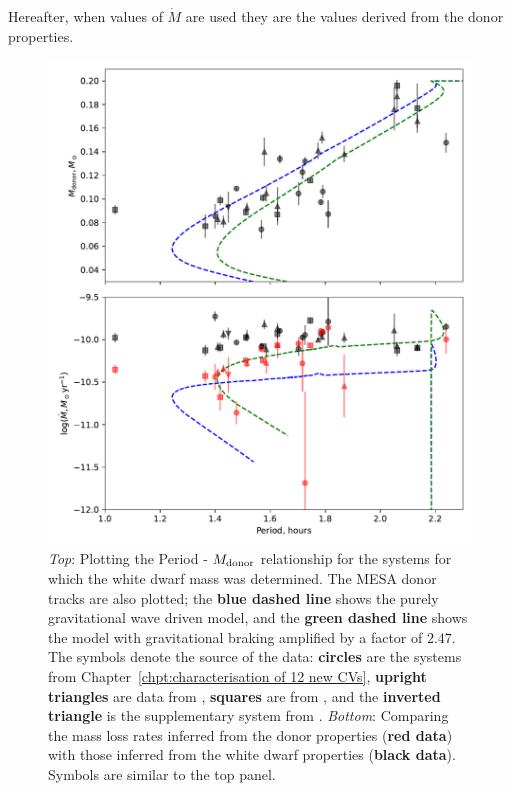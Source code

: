 Hereafter, when values of $\dot M$ are used they are the values derived from the donor properties.

\begin{figure}
    \centering
    \includegraphics[width=\textwidth]{figures/results/Mdot/compare_mdot_from_donor_vs_wd_vs_period_withmasses.pdf}
    \caption{{\it Top}: Plotting the Period - $M_{\rm donor}$ relationship for the systems for which the white dwarf mass was determined.
    The MESA donor tracks are also plotted; the {\bf blue dashed line} shows the purely gravitational wave driven model, and the {\bf green dashed line} shows the model with gravitational braking amplified by a factor of $2.47$. The symbols denote the source of the data: {\bf circles} are the systems from Chapter~\ref{chpt:characterisation of 12 new CVs}, {\bf upright triangles} are data from \citet{McAllister2019}, {\bf squares} are from \citet{Savoury2011}, and the {\bf inverted triangle} is the supplementary system from \citet{mcallister2017b}.
        {\it Bottom}: Comparing the mass loss rates inferred from the donor properties ({\bf red data}) with those inferred from the white dwarf properties ({\bf black data}). Symbols are similar to the top panel.}
    \label{fig:massloss and AML:compare Mdot from donor and wd}
\end{figure}

